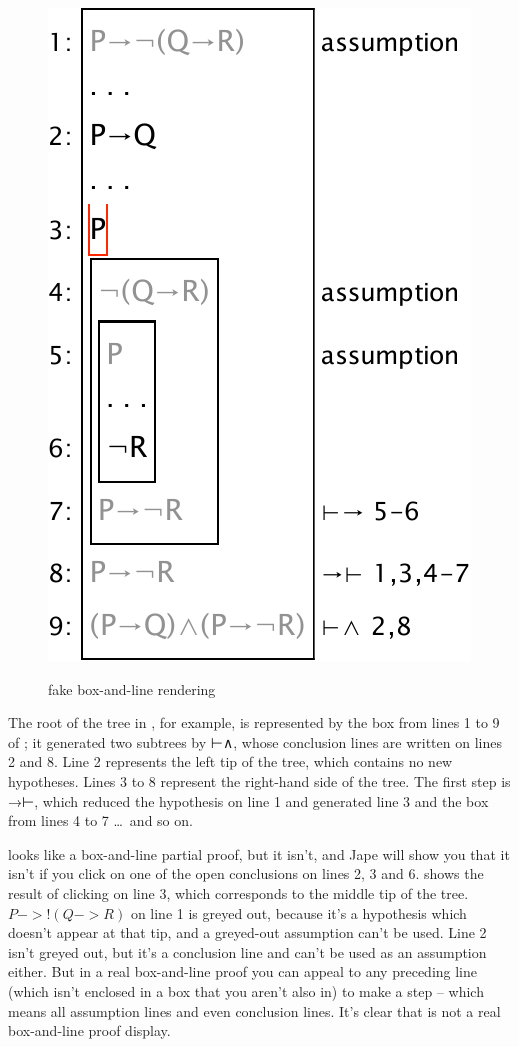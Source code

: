 \documentclass[11pt]{article}
\newcommand{\picscale}{0.6}
\begin{document}
\begin{figure}
{\includegraphics[scale=\picscale]{pics/firsttreeboxedgreyed}
\label{fig:firsttreeboxedgreyed}}
\caption{fake box-and-line rendering}
\label{fig:firsttreeboxedall}
\end{figure}

The root of the tree in , for example, is represented by the box from lines 1 to 9 of ; it generated two subtrees by ⊢∧, whose conclusion lines are written on lines 2 and 8. Line 2 represents the left tip of the tree, which contains no new hypotheses. Lines 3 to 8 represent the right-hand side of the tree. The first step is  
→⊢, which reduced the hypothesis on line 1 and generated line 3 and the box from lines 4 to 7 \dots\ and so on.

 looks like a box-and-line partial proof, but it isn't, and Jape will show you that it isn't if you click on one of the open conclusions on lines 2, 3 and 6.  shows the result of clicking on line 3, which corresponds to the middle tip of the tree. $P->!(Q->R)$ on line 1 is greyed out, because it's a hypothesis which doesn't appear at that tip, and a greyed-out assumption can't be used. Line 2 isn't greyed out, but it's a conclusion line and can't be used as an assumption either. But in a real box-and-line proof you can appeal to any preceding line (which isn't enclosed in a box that you aren't also in) to make a step -- which means all assumption lines and even conclusion lines. It's clear that  is not a real box-and-line proof display.
\end{document}
